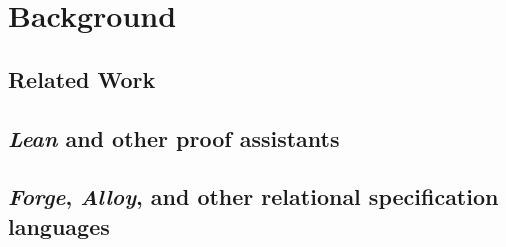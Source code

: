 \section{Background}
\subsection{Related Work}
\subsection{\emph{Lean} and other proof assistants}
\subsection{\emph{Forge}, \emph{Alloy}, and other relational specification languages}
